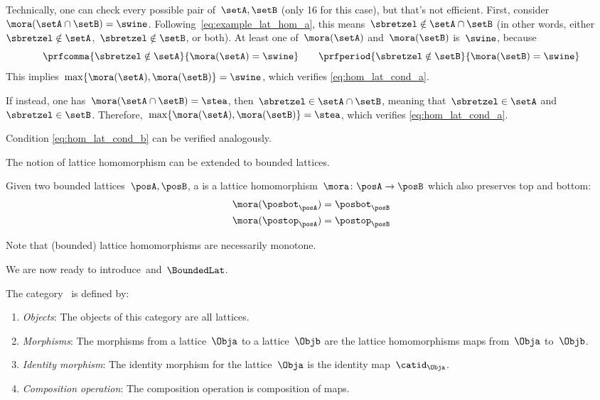 \begin{example}
	Technically, one can check every possible pair of~$\setA,\setB$ (only 16 for this case), but that's not efficient.
	First, consider~$\mora(\setA\cap \setB)=\swine$.
	Following~\cref{eq:example_lat_hom_a}, this means~$\sbretzel \notin \setA\cap \setB$ (in other words, either~$\sbretzel \notin \setA$,~$\sbretzel \notin \setB$, or both).
	At least one of~$\mora(\setA)$ and~$\mora(\setB)$ is~$\swine$, because
	\begin{equation*}
		\prfcomma{\sbretzel \notin \setA}{\mora(\setA)=\swine} \qquad
		\prfperiod{\sbretzel \notin \setB}{\mora(\setB)=\swine}
	\end{equation*}
	This implies~$\max\{\mora(\setA),\mora(\setB)\}=\swine$, which verifies \cref{eq:hom_lat_cond_a}.

	If instead, one has~$\mora(\setA\cap \setB)=\stea$, then~$\sbretzel \in \setA\cap \setB$, meaning that~$\sbretzel \in \setA$ and~$\sbretzel \in \setB$.
	Therefore,~$\max\{ \mora(\setA),\mora(\setB)\}=\stea$, which verifies \cref{eq:hom_lat_cond_a}.

	Condition \cref{eq:hom_lat_cond_b} can be verified analogously.
\end{example}

The notion of lattice homomorphism can be extended to bounded lattices.

\begin{ctdefinition}
	\label{def:bounded_lat_homomorphism}
	Given two bounded lattices~$\posA,\posB$, a \emph{} is a lattice homomorphism~$\mora\colon \posA\to \posB$ which also preserves top and bottom:
	\begin{equation}
		\begin{aligned}
			\mora(\posbot_\posA) & =\posbot_\posB \\
			\mora(\postop_\posA) & =\postop_\posB
		\end{aligned}
	\end{equation}
\end{ctdefinition}

Note that (bounded) lattice homomorphisms are necessarily monotone.

We are now ready to introduce~\Lat and~$\BoundedLat$.

\begin{ctdefinition}
	\label{def:Lat}
	The category~\iindex{\Lat} is defined by:
	\begin{enumerate}
		\item \emph{Objects}: The objects of this category are all lattices.
		\item \emph{Morphisms}: The morphisms from a lattice~$\Obja$ to a lattice~$\Objb$ are the lattice homomorphisms maps from~$\Obja$ to~$\Objb$.
		\item \emph{Identity morphism}: The identity morphism for the lattice~$\Obja$
		      is the identity map~$\catid_\Obja$.
		\item \emph{Composition operation}: The composition operation is composition of maps.
	\end{enumerate}
\end{ctdefinition}

